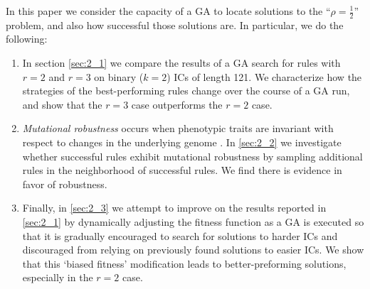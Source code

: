 In this paper we consider the capacity of a GA to locate solutions to the ``$\rho = \frac{1}{2}$'' problem, and also how successful those solutions are. In particular, we do the following: 
\begin{enumerate}
	\item In section \ref{sec:2_1} we compare the results of a GA search for rules 
	with $r = 2$ and $r = 3$ on binary ($k = 2$) 
	ICs of length 121. We characterize how the strategies of the best-performing rules change over the course of a GA run, 
	and show that the $r = 3$ case outperforms the $r = 2$ case.
	\item \textit{Mutational robustness} occurs when phenotypic traits are invariant with respect to changes in the underlying genome \cite{wagner_role_2012}.  
	In \ref{sec:2_2} we investigate whether successful rules exhibit mutational robustness by sampling additional rules in the neighborhood of successful rules. We find there is evidence in favor of robustness.
	\item Finally, in \ref{sec:2_3} we attempt to improve on the results reported in \ref{sec:2_1} by dynamically adjusting the fitness function as a GA  
	is executed so that it is gradually encouraged to search for solutions to harder ICs and discouraged from relying on previously found 
	solutions to easier ICs. We show that this `biased fitness' 
	modification leads to better-preforming solutions, especially in the $r = 2$ case. 
\end{enumerate}








